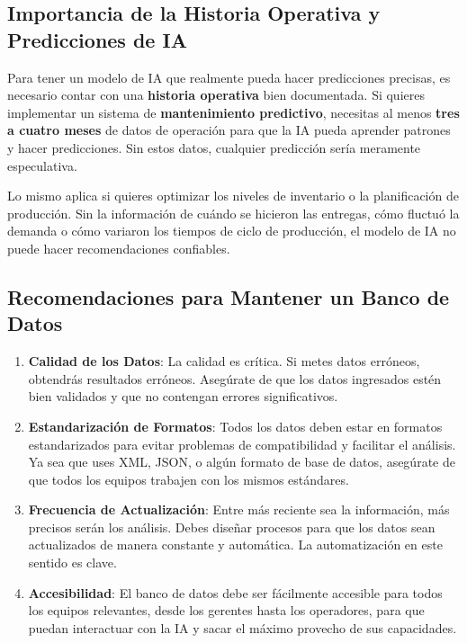 \documentclass[
  10pt,
  letterpaper,
]{book}
\begin{document}
\subsection{Importancia de la Historia Operativa y Predicciones de
IA}\label{importancia-de-la-historia-operativa-y-predicciones-de-ia}

Para tener un modelo de IA que realmente pueda hacer predicciones
precisas, es necesario contar con una \textbf{historia operativa} bien
documentada. Si quieres implementar un sistema de \textbf{mantenimiento
predictivo}, necesitas al menos \textbf{tres a cuatro meses} de datos de
operación para que la IA pueda aprender patrones y hacer predicciones.
Sin estos datos, cualquier predicción sería meramente especulativa.

Lo mismo aplica si quieres optimizar los niveles de inventario o la
planificación de producción. Sin la información de cuándo se hicieron
las entregas, cómo fluctuó la demanda o cómo variaron los tiempos de
ciclo de producción, el modelo de IA no puede hacer recomendaciones
confiables.

\subsection{Recomendaciones para Mantener un Banco de
Datos}\label{recomendaciones-para-mantener-un-banco-de-datos}

\begin{enumerate}
\def\labelenumi{\arabic{enumi}.}
\item
  \textbf{Calidad de los Datos}: La calidad es crítica. Si metes datos
  erróneos, obtendrás resultados erróneos. Asegúrate de que los datos
  ingresados estén bien validados y que no contengan errores
  significativos.
\item
  \textbf{Estandarización de Formatos}: Todos los datos deben estar en
  formatos estandarizados para evitar problemas de compatibilidad y
  facilitar el análisis. Ya sea que uses XML, JSON, o algún formato de
  base de datos, asegúrate de que todos los equipos trabajen con los
  mismos estándares.
\item
  \textbf{Frecuencia de Actualización}: Entre más reciente sea la
  información, más precisos serán los análisis. Debes diseñar procesos
  para que los datos sean actualizados de manera constante y automática.
  La automatización en este sentido es clave.
\item
  \textbf{Accesibilidad}: El banco de datos debe ser fácilmente
  accesible para todos los equipos relevantes, desde los gerentes hasta
  los operadores, para que puedan interactuar con la IA y sacar el
  máximo provecho de sus capacidades.
\end{enumerate}
\end{document}
